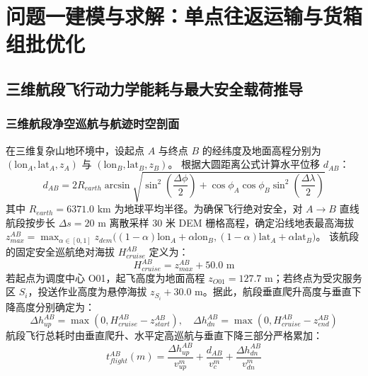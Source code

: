 \section{问题一建模与求解：单点往返运输与货箱组批优化}

\subsection{三维航段飞行动力学能耗与最大安全载荷推导}

\subsubsection{三维航段净空巡航与航迹时空剖面}
在三维复杂山地环境中，设起点 $A$ 与终点 $B$ 的经纬度及地面高程分别为 $(\text{lon}_A, \text{lat}_A, z_A)$ 与 $(\text{lon}_B, \text{lat}_B, z_B)$。
根据大圆距离公式计算水平位移 $d_{AB}$：
\begin{equation}
    d_{AB} = 2 R_{earth} \arcsin \sqrt{\sin^2\left(\frac{\Delta \phi}{2}\right) + \cos\phi_A \cos\phi_B \sin^2\left(\frac{\Delta \lambda}{2}\right)}
    \label{eq:haversine}
\end{equation}
其中 $R_{earth} = 6371.0\text{ km}$ 为地球平均半径。为确保飞行绝对安全，对 $A \to B$ 直线航段按步长 $\Delta s = 20\text{ m}$ 离散采样 30 米 DEM 栅格高程，确定沿线地表最高海拔 $z_{max}^{AB} = \max_{\alpha \in [0, 1]} z_{dem}\big((1-\alpha)\text{lon}_A + \alpha\text{lon}_B, (1-\alpha)\text{lat}_A + \alpha\text{lat}_B\big)$。
该航段的固定安全巡航绝对海拔 $H_{cruise}^{AB}$ 定义为：
\begin{equation}
    H_{cruise}^{AB} = z_{max}^{AB} + 50.0\text{ m}
    \label{eq:cruise_alt}
\end{equation}
若起点为调度中心 O01，起飞高度为地面高程 $z_{O01} = 127.7\text{ m}$；若终点为受灾服务区 $S_i$，投送作业高度为悬停海拔 $z_{S_i} + 30.0\text{ m}$。据此，航段垂直爬升高度与垂直下降高度分别确定为：
\begin{equation}
    \Delta h_{up}^{AB} = \max\left(0, H_{cruise}^{AB} - z_{start}^{AB}\right), \quad \Delta h_{dn}^{AB} = \max\left(0, H_{cruise}^{AB} - z_{end}^{AB}\right)
\end{equation}
航段飞行总耗时由垂直爬升、水平定高巡航与垂直下降三部分严格累加：
\begin{equation}
    t_{flight}^{AB}(m) = \frac{\Delta h_{up}^{AB}}{v_{up}^m} + \frac{d_{AB}}{v_c^m} + \frac{\Delta h_{dn}^{AB}}{v_{dn}^m}
    \label{eq:flight_time}
\end{equation}

